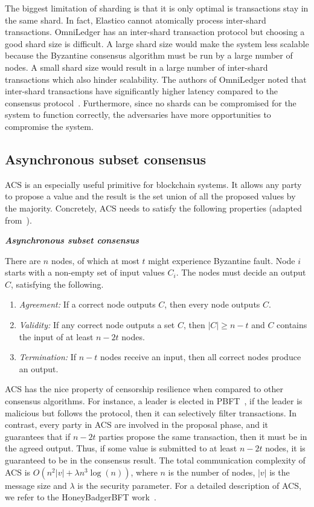 The biggest limitation of sharding is that it is only optimal is transactions stay in the same shard.
In fact, Elastico cannot atomically process inter-shard transactions.
OmniLedger has an inter-shard transaction protocol but choosing a good shard size is difficult.
A large shard size would make the system less scalable because the Byzantine consensus algorithm must be run by a large number of nodes.
A small shard size would result in a large number of inter-shard transactions which also hinder scalability.
The authors of OmniLedger noted that inter-shard transactions have significantly higher latency compared to the consensus protocol~\cite{kokoris2017omniledger}.
Furthermore, since no shards can be compromised for the system to function correctly,
the adversaries have more opportunities to compromise the system.

\subsection{Asynchronous subset consensus}
\label{sec:acs-background}

ACS is an especially useful primitive for blockchain systems.
It allows any party to propose a value and the result is the set union of all the proposed values by the majority.
Concretely, ACS needs to satisfy the following properties (adapted from~\cite{miller2016honey}).
\begin{definition}
\label{def:acs}
\textbf{\emph{Asynchronous subset consensus}}

There are $n$ nodes, of which at most $t$ might experience Byzantine fault.
Node $i$ starts with a non-empty set of input values $C_i$.
The nodes must decide an output $C$, satisfying the following.
\begin{enumerate}
    \item \emph{Agreement:}
        If a correct node outputs $C$, then every node outputs $C$.
    \item \emph{Validity:}
        If any correct node outputs a set $C$,
        then $|C| \ge n - t$ and $C$ contains the input of at least $n - 2t$ nodes.
    \item \emph{Termination:}
        If $n - t$ nodes receive an input, then all correct nodes produce an output.
\end{enumerate}
\end{definition}

ACS has the nice property of censorship resilience when compared to other consensus algorithms.
For instance, a leader is elected in PBFT~\cite{castro1999practical},
if the leader is malicious but follows the protocol, then it can selectively filter transactions.
In contrast, every party in ACS are involved in the proposal phase,
and it guarantees that if $n - 2t$ parties propose the same transaction, then it must be in the agreed output.
Thus, if some value is submitted to at least $n - 2t$ nodes, it is guaranteed to be in the consensus result.
The total communication complexity of ACS is $O(n^2 |v| + \lambda n^3 \log(n))$,
where $n$ is the number of nodes, $|v|$ is the message size and $\lambda$ is the security parameter.
For a detailed description of ACS, we refer to the HoneyBadgerBFT work~\cite{miller2016honey}.
